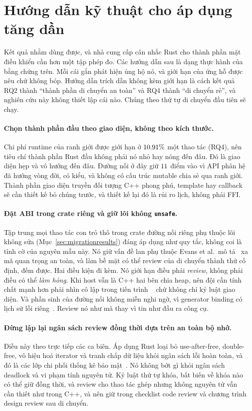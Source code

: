 \section{Hướng dẫn kỹ thuật cho áp dụng tăng dần}
\label{sec:guidelines}
Kết quả nhằm dùng được, và nhà cung cấp cân nhắc Rust cho thành phần mặt điều khiển
cần hơn một tập phép đo. Các hướng dẫn sau là dạng thực hành của
bằng chứng trên. Mỗi cái gắn phát hiện ủng hộ nó, và giới hạn của
ứng hỗ được nêu chứ không bóp. Hướng dẫn trích dẫn không kèm giới hạn là cách kết quả
RQ2 thành ``thành phần di chuyển an toàn'' và RQ4 thành ``di chuyển
rẻ'', và nghiên cứu này không thiết lập cái nào. Chúng theo thứ tự di chuyển
đầu tiên sẽ chạy.

\paragraph{Chọn thành phần đầu theo giao diện, không theo kích thước.}
Chi phí runtime của ranh giới được giới hạn ở $10.91\%$ một thao tác (RQ4), nên
tiêu chí thành phần Rust đầu không phải nó nhỏ hay nóng đến đâu. Đó là giao diện
hẹp và vô hướng đến đâu. Đường nối ở đây giữ $11$ điểm vào vì API phân hệ
đã hướng vòng đời, có kiểu, và không có cấu trúc mutable chia sẻ qua
ranh giới. Thành phần giao diện truyền đối tượng C++ phong phú, template hay callback sẽ cần
thiết kế bỏ chúng trước, và thiết kế lại đó là rủi ro lịch, không phải FFI.

\paragraph{Đặt ABI trong crate riêng và giữ lõi không \texttt{unsafe}.}
Tập trung mọi thao tác con trỏ thô trong crate đường nối riêng phụ thuộc lõi không sửa
(Mục~\ref{sec:migrationresults}) đáng áp dụng như quy tắc, không coi là
tình cờ của nguyên mẫu này. Nó giữ vấn đề lan phụ thuộc Evans et al.\
mô tả~\cite{evans2020rust} xa mã quan trọng an toàn, và làm bề mặt
có thể review của di chuyển thành thứ cố định, đếm được. Hai điều kiện đi kèm. Nó giới hạn
điều phải \emph{review}, không phải điều có thể \emph{làm hỏng}. Khi host vẫn là C++ hai bên
chia heap, nên đội cần tính chất mạnh hơn phải nhìn cô lập trong tiến trình
~\cite{rivera2021galeed,kirth2022pkrusafe} chứ không chỉ kỷ luật giao diện.
Và phần sinh của đường nối không miễn nghi ngờ, vì generator binding có lịch sử
lỗi riêng~\cite{cai2026interop}. Review nó như mã thay vì tin như đầu ra
công cụ.

\paragraph{Đừng lập lại ngân sách review đồng thời dựa trên an toàn bộ nhớ.}
Điều này theo trực tiếp các ca biên. Áp dụng Rust loại bỏ use-after-free,
double-free, vô hiệu hoá iterator và tranh chấp dữ liệu khỏi ngân sách lỗi hoàn toàn, và đó
là các lớp chi phối thống kê bảo mật~\cite{msrc2019memory,google2022android}.
Nó không bớt gì khỏi ngân sách deadlock và vi phạm tính nguyên tử. Kỷ luật thứ tự khóa,
bất biến về khóa nào có thể giữ đồng thời, và review cho
thao tác ghép nhưng không nguyên tử vẫn cần thiết như trong C++, và
nên giữ trong checklist code review và chương trình design review sau di chuyển.

